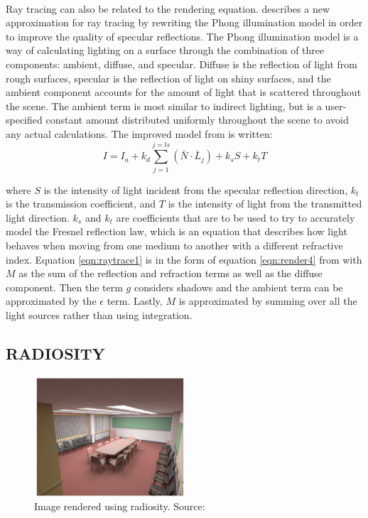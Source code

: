 \paragraph{}
Ray tracing can also be related to the rendering equation.  \cite{Whitted1980} describes a new approximation for ray tracing by rewriting the Phong illumination model in order to improve the quality of specular reflections.  The Phong illumination model is a way of calculating lighting on a surface through the combination of three components: ambient, diffuse, and specular.  Diffuse is the reflection of light from rough surfaces, specular is the reflection of light on shiny surfaces, and the ambient component accounts for the amount of light that is scattered throughout the scene.  The ambient term is most similar to indirect lighting, but is a user-specified constant amount distributed uniformly throughout the scene to avoid any actual calculations.  The improved model from \cite{Whitted1980} is written:
\begin{equation}
I = I_{a} + k_{d}\sum_{j=1}^{j=ls}(\bar{N}\cdot\bar{L}_{j})+k_{s}S + k_{t}T \label{eqn:raytrace1}
\end{equation}

where $S$ is the intensity of light incident from the specular reflection direction, $k_{t}$ is the transmission coefficient, and $T$ is the intensity of light from the transmitted light direction. $k_{s}$ and $k_{t}$ are coefficients that are to be used to try to accurately model the Fresnel reflection law, which is an equation that describes how light behaves when moving from one medium to another with a different refractive index.  Equation \ref{eqn:raytrace1} is in the form of equation \ref{eqn:render4} from \cite{Kajiya1986} with $M$ as the sum of the reflection and refraction terms as well as the diffuse component. Then the term $g$ considers shadows and the ambient term can be approximated by the $\epsilon$ term.  Lastly, $M$ is approximated by summing over all the light sources rather than using integration.

\subsection{RADIOSITY}

\begin{figure}[h!]
  \centering
    \includegraphics[width=0.5\textwidth]{radiositySample.jpg}
  \caption{Image rendered using radiosity. Source: \protect\cite{Keller1997}}
	\label{fig:radiositySample}
\end{figure}

